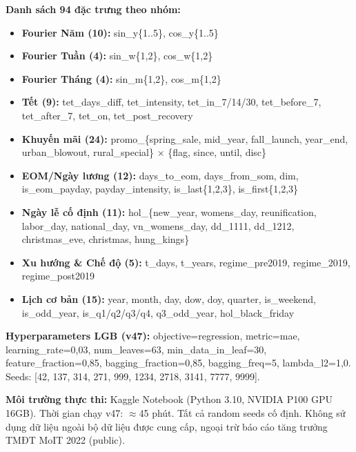 \documentclass{article}
\begin{document}
\textbf{Danh sách 94 đặc trưng theo nhóm:}
\begin{itemize}
  \item \textbf{Fourier Năm (10):} sin\_y\{1..5\}, cos\_y\{1..5\}
  \item \textbf{Fourier Tuần (4):} sin\_w\{1,2\}, cos\_w\{1,2\}
  \item \textbf{Fourier Tháng (4):} sin\_m\{1,2\}, cos\_m\{1,2\}
  \item \textbf{Tết (9):} tet\_days\_diff, tet\_intensity, tet\_in\_7/14/30, tet\_before\_7, tet\_after\_7, tet\_on, tet\_post\_recovery
  \item \textbf{Khuyến mãi (24):} promo\_\{spring\_sale, mid\_year, fall\_launch, year\_end, urban\_blowout, rural\_special\} × \{flag, since, until, disc\}
  \item \textbf{EOM/Ngày lương (12):} days\_to\_eom, days\_from\_som, dim, is\_eom\_payday, payday\_intensity, is\_last\{1,2,3\}, is\_first\{1,2,3\}
  \item \textbf{Ngày lễ cố định (11):} hol\_\{new\_year, womens\_day, reunification, labor\_day, national\_day, vn\_womens\_day, dd\_1111, dd\_1212, christmas\_eve, christmas, hung\_kings\}
  \item \textbf{Xu hướng \& Chế độ (5):} t\_days, t\_years, regime\_pre2019, regime\_2019, regime\_post2019
  \item \textbf{Lịch cơ bản (15):} year, month, day, dow, doy, quarter, is\_weekend, is\_odd\_year, is\_q1/q2/q3/q4, q3\_odd\_year, hol\_black\_friday
\end{itemize}

\textbf{Hyperparameters LGB (v47):} objective=regression, metric=mae, learning\_rate=0,03, num\_leaves=63, min\_data\_in\_leaf=30, feature\_fraction=0,85, bagging\_fraction=0,85, bagging\_freq=5, lambda\_l2=1,0. Seeds: [42, 137, 314, 271, 999, 1234, 2718, 3141, 7777, 9999].

\textbf{Môi trường thực thi:} Kaggle Notebook (Python 3.10, NVIDIA P100 GPU 16GB). Thời gian chạy v47: $\approx$45 phút. Tất cả random seeds cố định. Không sử dụng dữ liệu ngoài bộ dữ liệu được cung cấp, ngoại trừ báo cáo tăng trưởng TMĐT MoIT 2022 (public).
\end{document}

